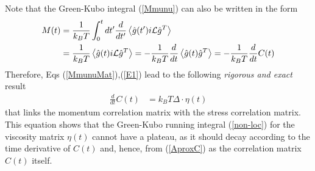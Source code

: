 \documentclass[a4paper,openright,12pt]{book}
\newcommand{\esc}{\!\cdot\!}
\newcommand{\llangle}{\left\langle}
\newcommand{\rrangle}{\right\rangle}
\begin{document}
Note that the Green-Kubo integral (\ref{Mmunu}) can also be written
in the form
\begin{align}
    M(t)&= \frac{1}{k_BT} \int_0^t dt'\frac{d}{dt'}\llangle \hat{g}(t') i{\cal L}\hat{g}^T\rrangle
\nonumber\\
&= \frac{1}{k_BT} \llangle \hat{g}(t) i{\cal L}\hat{g}^T\rrangle
=  -\frac{1}{k_BT}\frac{d}{dt}\llangle \hat{g}(t) \hat{g}^T\rrangle=-\frac{1}{k_BT}\frac{d}{dt}C(t)
\label{E1}
\end{align}
Therefore,  Eqs  (\ref{MmunuMat}),(\ref{E1})  lead  to  the  following
\textit{rigorous and exact} result
\begin{align}
\frac{d}{dt}C(t)&= k_BT \Delta\esc \eta(t)
\label{etaExact}
\end{align}
that links the momentum correlation matrix with the stress correlation
matrix.  This  equation shows  that  the  Green-Kubo running  integral
(\ref{non-loc})  for  the viscosity  matrix  $\eta(t)$  cannot have  a
plateau, as it should decay according to the time derivative of $C(t)$
and,  hence, from  (\ref{AproxC})  as the  correlation matrix  $C(t)$
itself.
\end{document}
